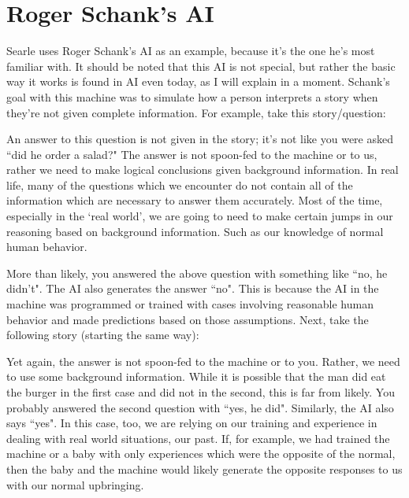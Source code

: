 \section{Roger Schank's AI}
Searle uses Roger Schank's AI as an example, because it's the one he's most familiar with. It should be noted that this AI is not special, but rather the basic way it works is found in AI even today, as I will explain in a moment. Schank's goal with this machine was to simulate how a person interprets a story when they're not given complete information. For example, take this story/question:


An answer to this question is not given in the story; it's not like you were asked ``did he order a salad?" The answer is not spoon-fed to the machine or to us, rather we need to make logical conclusions given background information. In real life, many of the questions which we encounter do not contain all of the information which are necessary to answer them accurately. Most of the time, especially in the `real world', we are going to need to make certain jumps in our reasoning based on background information. Such as our knowledge of normal human behavior.

More than likely, you answered the above question with something like ``no, he didn't". The AI also generates the answer ``no". This is because the AI in the machine was programmed or trained with cases involving reasonable human behavior and made predictions based on those assumptions. Next, take the following story (starting the same way):


Yet again, the answer is not spoon-fed to the machine or to you. Rather, we need to use some background information. While it is possible that the man did eat the burger in the first case and did not in the second, this is far from likely. You probably answered the second question with ``yes, he did". Similarly, the AI also says ``yes". In this case, too, we are relying on our training and experience in dealing with real world situations, our past. If, for example, we had trained the machine or a baby with only experiences which were the opposite of the normal, then the baby and the machine would likely generate the opposite responses to us with our normal upbringing. 

